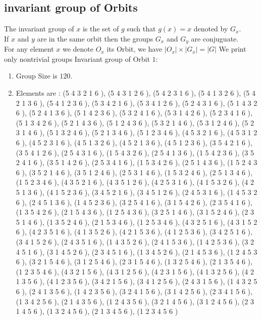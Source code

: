 \documentclass[12pt]{article}
\begin{document}
\subsection{invariant group of Orbits}
\noindent The invariant group of $x$ is the set of $g$ such that $g(x)=x$ denoted by $G_x$.\\
If $x$ and $y$ are in the same orbit then the groups $G_x$ and  $G_y$ are conjuguate.\\
For any element $x$ we denote $O_x$ its Orbit, we have $|O_x|\times |G_x|=|G|$
We print only nontrivial groups
Invariant group of Orbit $1$:
\begin{enumerate}
\item Group Size is $120$.
\item Elements are : (5 4 3 2 1 6  ), (5 4 3 1 2 6  ), (5 4 2 3 1 6  ), (5 4 1 3 2 6  ), (5 4 2 1 3 6  ), (5 4 1 2 3 6  ), (5 3 4 2 1 6  ), (5 3 4 1 2 6  ), (5 2 4 3 1 6  ), (5 1 4 3 2 6  ), (5 2 4 1 3 6  ), (5 1 4 2 3 6  ), (5 3 2 4 1 6  ), (5 3 1 4 2 6  ), (5 2 3 4 1 6  ), (5 1 3 4 2 6  ), (5 2 1 4 3 6  ), (5 1 2 4 3 6  ), (5 3 2 1 4 6  ), (5 3 1 2 4 6  ), (5 2 3 1 4 6  ), (5 1 3 2 4 6  ), (5 2 1 3 4 6  ), (5 1 2 3 4 6  ), (4 5 3 2 1 6  ), (4 5 3 1 2 6  ), (4 5 2 3 1 6  ), (4 5 1 3 2 6  ), (4 5 2 1 3 6  ), (4 5 1 2 3 6  ), (3 5 4 2 1 6  ), (3 5 4 1 2 6  ), (2 5 4 3 1 6  ), (1 5 4 3 2 6  ), (2 5 4 1 3 6  ), (1 5 4 2 3 6  ), (3 5 2 4 1 6  ), (3 5 1 4 2 6  ), (2 5 3 4 1 6  ), (1 5 3 4 2 6  ), (2 5 1 4 3 6  ), (1 5 2 4 3 6  ), (3 5 2 1 4 6  ), (3 5 1 2 4 6  ), (2 5 3 1 4 6  ), (1 5 3 2 4 6  ), (2 5 1 3 4 6  ), (1 5 2 3 4 6  ), (4 3 5 2 1 6  ), (4 3 5 1 2 6  ), (4 2 5 3 1 6  ), (4 1 5 3 2 6  ), (4 2 5 1 3 6  ), (4 1 5 2 3 6  ), (3 4 5 2 1 6  ), (3 4 5 1 2 6  ), (2 4 5 3 1 6  ), (1 4 5 3 2 6  ), (2 4 5 1 3 6  ), (1 4 5 2 3 6  ), (3 2 5 4 1 6  ), (3 1 5 4 2 6  ), (2 3 5 4 1 6  ), (1 3 5 4 2 6  ), (2 1 5 4 3 6  ), (1 2 5 4 3 6  ), (3 2 5 1 4 6  ), (3 1 5 2 4 6  ), (2 3 5 1 4 6  ), (1 3 5 2 4 6  ), (2 1 5 3 4 6  ), (1 2 5 3 4 6  ), (4 3 2 5 1 6  ), (4 3 1 5 2 6  ), (4 2 3 5 1 6  ), (4 1 3 5 2 6  ), (4 2 1 5 3 6  ), (4 1 2 5 3 6  ), (3 4 2 5 1 6  ), (3 4 1 5 2 6  ), (2 4 3 5 1 6  ), (1 4 3 5 2 6  ), (2 4 1 5 3 6  ), (1 4 2 5 3 6  ), (3 2 4 5 1 6  ), (3 1 4 5 2 6  ), (2 3 4 5 1 6  ), (1 3 4 5 2 6  ), (2 1 4 5 3 6  ), (1 2 4 5 3 6  ), (3 2 1 5 4 6  ), (3 1 2 5 4 6  ), (2 3 1 5 4 6  ), (1 3 2 5 4 6  ), (2 1 3 5 4 6  ), (1 2 3 5 4 6  ), (4 3 2 1 5 6  ), (4 3 1 2 5 6  ), (4 2 3 1 5 6  ), (4 1 3 2 5 6  ), (4 2 1 3 5 6  ), (4 1 2 3 5 6  ), (3 4 2 1 5 6  ), (3 4 1 2 5 6  ), (2 4 3 1 5 6  ), (1 4 3 2 5 6  ), (2 4 1 3 5 6  ), (1 4 2 3 5 6  ), (3 2 4 1 5 6  ), (3 1 4 2 5 6  ), (2 3 4 1 5 6  ), (1 3 4 2 5 6  ), (2 1 4 3 5 6  ), (1 2 4 3 5 6  ), (3 2 1 4 5 6  ), (3 1 2 4 5 6  ), (2 3 1 4 5 6  ), (1 3 2 4 5 6  ), (2 1 3 4 5 6  ), (1 2 3 4 5 6  )
\end{enumerate}
\end{document}
